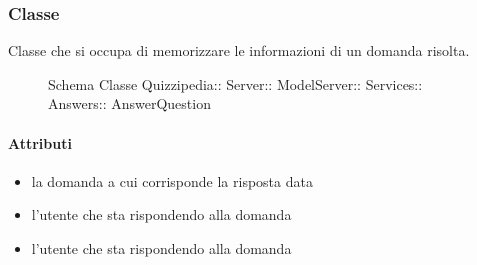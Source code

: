 \subsubsection{Classe }
Classe che si occupa di memorizzare le informazioni di un domanda risolta.
\begin{figure}[H]
\centering
\noindent{}
\caption[Schema Classe AnswerQuestion]{Schema Classe Quizzipedia:: Server:: ModelServer:: Services:: Answers:: AnswerQuestion}
\end{figure}
\paragraph{Attributi}
\begin{itemize}
\item {}
\newline
la domanda a cui corrisponde la risposta data
\item {}
\newline
l'utente che sta rispondendo alla domanda
\item {}
\newline
l'utente che sta rispondendo alla domanda
\end{itemize}
